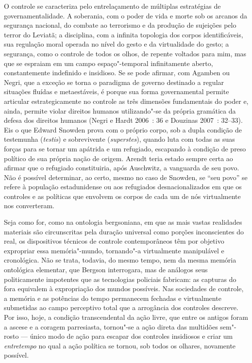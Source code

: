 O controle se caracteriza pelo entrelaçamento de múltiplas estratégias
de governamentalidade. A soberania, com o poder de vida e morte sob os
arcanos da segurança nacional, do combate ao terrorismo e da produção de
sujeições pelo terror do Leviatã; a disciplina, com a infinita topologia
dos corpos identificáveis, sua regulação moral operada no nível do gesto
e da virtualidade do gesto; a segurança, como o controle de todos os
olhos, de repente voltados para mim, mas que se espraiam em um campo
espaço"-temporal infinitamente aberto, constantemente indefinido e
insidioso. Se se pode afirmar, com Agamben ou Negri, que a exceção se
torna o paradigma de governo destinado a regular situações fluídas e
metaestáveis, é porque sua forma governamental permite articular
estrategicamente no controle as três dimensões fundamentais do poder e,
ainda, permite violar direitos humanos utilizando"-se da própria
gramática da defesa dos direitos humanos (Negri e Hardt 2006~: 36 e
Douzinas 2007~: 32--33). Eis o que Edward Snowden prova com o próprio
corpo, sob a dupla condição de testemunha (\emph{testis}) e sobrevivente
(\emph{superstes}), quando luta com todas as suas forças para se tornar
um apátrida e um refugiado, escapando à condição de preso político de
sua própria nação de origem. Arendt teria estado sempre certa ao afirmar
que o refugiado constituiria, após Auschwitz, a vanguarda de seu povo.
Não é possível determinar, ao certo, mesmo no caso de Snowden, se ``seu
povo'' se refere à população estadunidense ou aos refugiados
desnacionalizados em que os controles e as políticas que envolvem os
corpos de cada um de nós virtualmente nos converteram.

Seja como for, como na ontologia bergsoniana, em que as mais vastas
realidades materiais são circunscritas pela duração universal como
porções inconscientes do real, os dispositivos técnicos de controle
contemporâneos têm por objetivo expropriar essa memória"-mundo,
tornando"-a virtualmente manipulável e cronológica. Não se trata,
todavia, do mesmo tempo, nem da mesma memória ontológica elementar, que
Bergson interrogara, mas de análogos seus politicamente impotentes que
as tecnologias policiais fabricam: as capturas do fora equivalem à
expropriação dos mundos possíveis. Nas sociedades de controle, a memória
e as potências do tempo permanecem fechadas e virtualmente submetidas ao
campo perceptivo total que a arrogância dos controles descreve. Por
isso, hoje, a condição transcendental da ação livre, que entre os
antigos foram a ascese e a coragem parresiasta, tornou"-se a ação direta
das multidões sem"-rosto --- único modo de ação para escapar dos controles
insidiosos e criar um \emph{entretempo} no qual a ação política se
tornou, sob todos os olhares, novamente possível.

